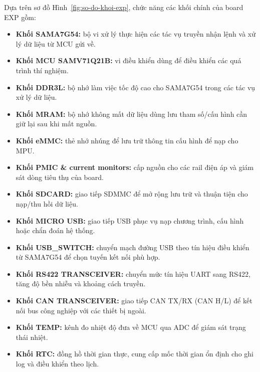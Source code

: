 Dựa trên sơ đồ Hình~\ref{fig:so-do-khoi-exp}, chức năng các khối chính của board EXP gồm:
\begin{itemize}
    \item \textbf{Khối SAMA7G54:} bộ vi xử lý thực hiện các tác vụ truyền nhận lệnh và xử lý dữ liệu từ MCU gửi về.

    \item \textbf{Khối MCU SAMV71Q21B:} vi điều khiển dùng để điều khiển các quá trình thí nghiệm.

    \item \textbf{Khối DDR3L:} bộ nhớ làm việc tốc độ cao cho SAMA7G54 trong các tác vụ xử lý dữ liệu.

    \item \textbf{Khối MRAM:} bộ nhớ không mất dữ liệu dùng lưu tham số/cấu hình cần giữ lại sau khi mất nguồn.

    \item \textbf{Khối eMMC:} thẻ nhớ nhúng để lưu trữ thông tin cấu hình để nạp cho MPU.

    \item \textbf{Khối PMIC \& current monitors:} cấp nguồn cho các rail điện áp và giám sát dòng tiêu thụ của board.

    \item \textbf{Khối SDCARD:} giao tiếp SDMMC để mở rộng lưu trữ và thuận tiện cho nạp/thu hồi dữ liệu.

    \item \textbf{Khối MICRO USB:} giao tiếp USB phục vụ nạp chương trình, cấu hình hoặc chẩn đoán hệ thống.

    \item \textbf{Khối USB\_SWITCH:} chuyển mạch đường USB theo tín hiệu điều khiển từ SAMA7G54 để chọn tuyến kết nối phù hợp.

    \item \textbf{Khối RS422 TRANSCEIVER:} chuyển mức tín hiệu UART sang RS422, tăng độ bền nhiễu và khoảng cách truyền.

    \item \textbf{Khối CAN TRANSCEIVER:} giao tiếp CAN TX/RX (CAN H/L) để kết nối bus công nghiệp với các thiết bị ngoài.

    \item \textbf{Khối TEMP:} kênh đo nhiệt độ đưa về MCU qua ADC để giám sát trạng thái nhiệt.

    \item \textbf{Khối RTC:} đồng hồ thời gian thực, cung cấp mốc thời gian ổn định cho ghi log và điều khiển theo lịch.


\end{itemize}
